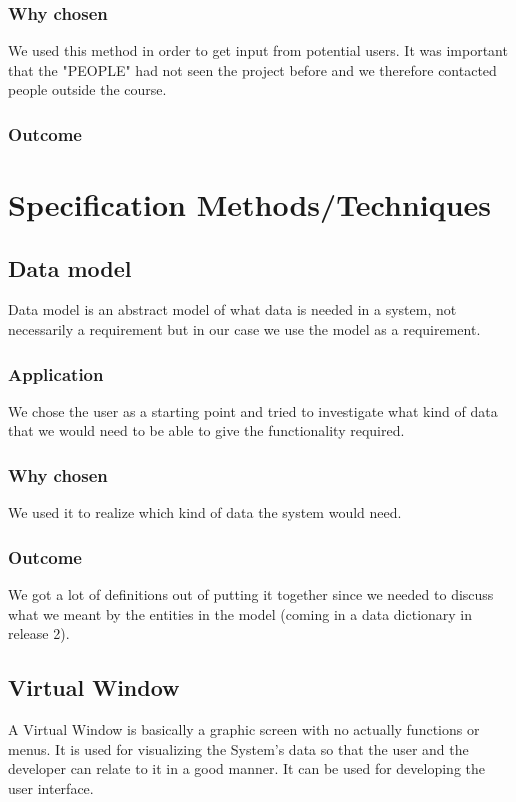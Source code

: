 \documentclass[a4paper]{article}
\begin{document}
    \subsubsection{Why chosen}
We used this method in order to get input from potential users. It was important that the "PEOPLE" had not seen the project before and we therefore contacted people outside the course.
    \subsubsection{Outcome}
 
	
	
	\section{Specification Methods/Techniques}
    \subsection{Data model}
Data model is an abstract model of what data is needed in a system, not necessarily a requirement but in our case we use the model as a requirement.
	
    \subsubsection{Application}
    We chose the user as a starting point and tried to investigate what kind of data that we would need to be able to give the functionality required.
    \subsubsection{Why chosen}
    We used it to realize which kind of data the system would need.
    \subsubsection{Outcome}
	We got a lot of definitions out of putting it together since we needed to discuss what we meant by the entities in the model (coming in a data dictionary in release 2).

    \subsection{Virtual Window}
      A Virtual Window is basically a graphic screen with no actually functions or menus. It is used for visualizing the System's data so that the user and the developer can relate to it in a good manner. It can be used for developing the user interface.
\end{document}
